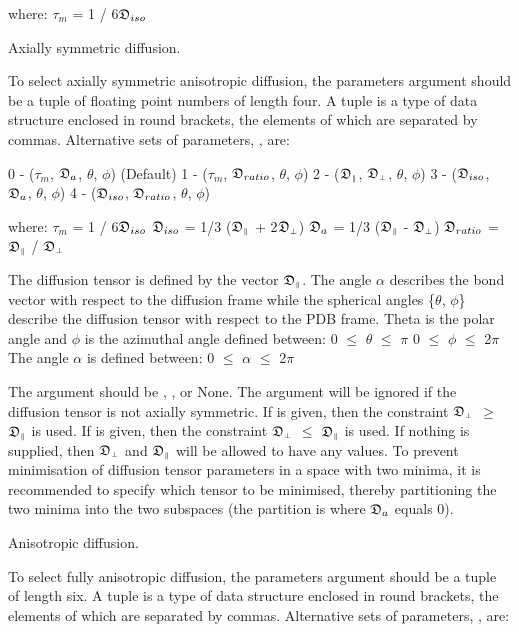 where:
    $\tau_m$ = 1 / 6$\mathfrak{D}_{iso}$


Axially symmetric diffusion.

To select axially symmetric anisotropic diffusion, the parameters argument should be a tuple
of floating point numbers of length four.  A tuple is a type of data structure enclosed in
round brackets, the elements of which are separated by commas.  Alternative sets of
parameters, 
, are:

    0 - ($\tau_m$, $\mathfrak{D}_a$, $\theta$, $\phi$)   (Default)
    1 - ($\tau_m$, $\mathfrak{D}_{ratio}$, $\theta$, $\phi$)
    2 - ($\mathfrak{D}_{\scriptscriptstyle \parallel}$, $\mathfrak{D}_{\scriptscriptstyle \perp}$, $\theta$, $\phi$)
    3 - ($\mathfrak{D}_{iso}$, $\mathfrak{D}_a$, $\theta$, $\phi$)
    4 - ($\mathfrak{D}_{iso}$, $\mathfrak{D}_{ratio}$, $\theta$, $\phi$)

where:
    $\tau_m$ = 1 / 6$\mathfrak{D}_{iso}$
    $\mathfrak{D}_{iso}$ = 1/3 ($\mathfrak{D}_{\scriptscriptstyle \parallel}$ + 2$\mathfrak{D}_{\scriptscriptstyle \perp}$)
    $\mathfrak{D}_a$ = 1/3 ($\mathfrak{D}_{\scriptscriptstyle \parallel}$ - $\mathfrak{D}_{\scriptscriptstyle \perp}$)
    $\mathfrak{D}_{ratio}$ = $\mathfrak{D}_{\scriptscriptstyle \parallel}$ / $\mathfrak{D}_{\scriptscriptstyle \perp}$

The diffusion tensor is defined by the vector $\mathfrak{D}_{\scriptscriptstyle \parallel}$.  The angle $\alpha$ describes the bond
vector with respect to the diffusion frame while the spherical angles \{$\theta$, $\phi$\} describe
the diffusion tensor with respect to the PDB frame.  Theta is the polar angle and $\phi$ is the
azimuthal angle defined between:
    0 $\le$ $\theta$ $\le$ $\pi$
    0 $\le$ $\phi$ $\le$ 2$\pi$
The angle $\alpha$ is defined between:
    0 $\le$ $\alpha$ $\le$ 2$\pi$

The 
 argument should be 
, 
, or None.  The argument will be
ignored if the diffusion tensor is not axially symmetric.  If 
 is given, then the
constraint $\mathfrak{D}_{\scriptscriptstyle \perp}$ $\ge$ $\mathfrak{D}_{\scriptscriptstyle \parallel}$ is used.  If 
 is given, then the constraint $\mathfrak{D}_{\scriptscriptstyle \perp}$ $\le$ $\mathfrak{D}_{\scriptscriptstyle \parallel}$ is
used.  If nothing is supplied, then $\mathfrak{D}_{\scriptscriptstyle \perp}$ and $\mathfrak{D}_{\scriptscriptstyle \parallel}$ will be allowed to have any values.  To
prevent minimisation of diffusion tensor parameters in a space with two minima, it is
recommended to specify which tensor to be minimised, thereby partitioning the two minima
into the two subspaces (the partition is where $\mathfrak{D}_a$ equals 0).


Anisotropic diffusion.

To select fully anisotropic diffusion, the parameters argument should be a tuple of length
six.  A tuple is a type of data structure enclosed in round brackets, the elements of which
are separated by commas.  Alternative sets of parameters, 
, are:

